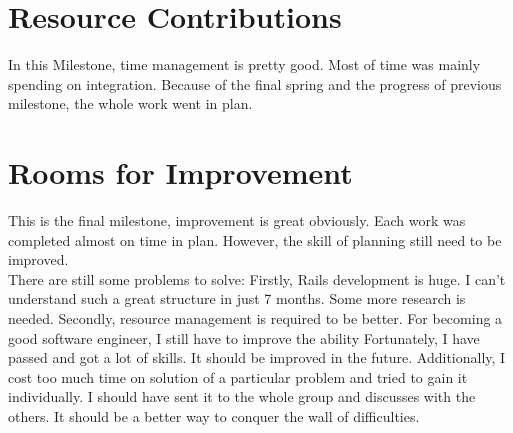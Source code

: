 \documentclass{article}
\begin{document}
\section*{Resource Contributions}

In this Milestone, time management is pretty good. Most of time was mainly spending on integration. Because of the final spring and the progress of previous milestone, the whole work went in plan.

\section*{Rooms for Improvement}

This is the final milestone, improvement is great obviously. Each work was completed almost on time in plan. However, the skill of planning still need to be improved.\\

There are still some problems to solve: Firstly, Rails development is huge. I can't understand such a great structure in just 7 months. Some more research is needed. Secondly, resource management is required to be better. For becoming a good software engineer, I still have to improve the ability Fortunately, I have passed and got a lot of skills. It should be improved in the future. Additionally, I cost too much time on solution of a particular problem and tried to gain it individually. I should have sent it to the whole group and discusses with the others. It should be a better way to conquer the wall of difficulties.
\end{document}
